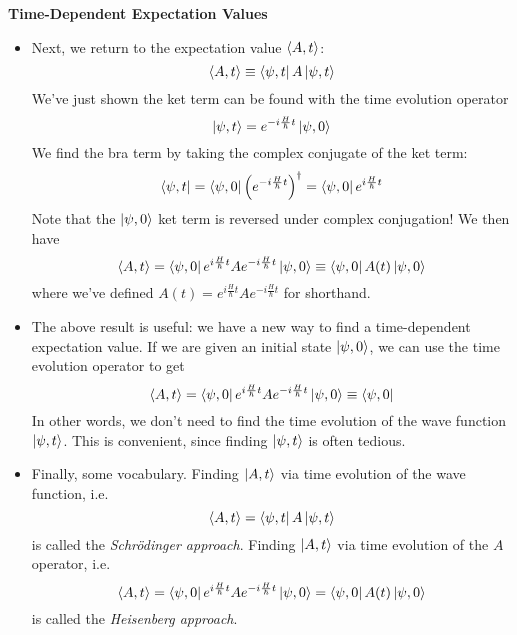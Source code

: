 \documentclass[11pt, a4paper]{article}
\newcommand{\Schro}{Schr\"{o}dinger\xspace}
\newcommand{\tev}{e^{-i\frac{H}{\hbar}t}}  %
\newcommand{\tevp}{e^{i\frac{H}{\hbar}t}}  %
\begin{document}
\textbf{Time-Dependent Expectation Values}
\begin{itemize}
	
	\item Next, we return to the expectation value $ \ev{A, t} $:
	\begin{equation*}
		\ev{A, t} \equiv \bra{\psi, t} A \ket{\psi, t}
	\end{equation*}
	We've just shown the ket term can be found with the time evolution operator
	\begin{equation*}
		\ket{\psi, t} = \tev \ket{\psi, 0}
	\end{equation*}
	We find the bra term by taking the complex conjugate of the ket term:
	\begin{equation*}
		\bra{\psi, t} = \bra{\psi, 0}\left(\tev\right)^{\dagger} = \bra{\psi, 0}\tevp
	\end{equation*}
	Note that the $ \ket{\psi, 0} $ ket term is reversed under complex conjugation! We then have
	\begin{equation*}
		\ev{A, t} = \bra{\psi, 0}\tevp A \tev \ket{\psi, 0} \equiv  \bra{\psi, 0} A(t) \ket{\psi, 0}
	\end{equation*}
	where we've defined $ A(t) = \tevp A \tev  $ for shorthand.
	
	\item The above result is useful: we have a new way to find a time-dependent expectation value. If we are given an initial state $ \ket{\psi, 0} $, we can use the time evolution operator to get
	\begin{equation*}
		\ev{A, t} = \bra{\psi, 0}\tevp A \tev \ket{\psi, 0} \equiv  \bra{\psi, 0}
	\end{equation*}
	In other words, we don't need to find the time evolution of the wave function $ \ket{\psi, t} $. This is convenient, since finding $ \ket{\psi, t} $ is often tedious.
	
	\item Finally, some vocabulary. Finding $ \ket{A, t} $ via time evolution of the wave function, i.e. 
	\begin{equation*}
		\ev{A, t} = \bra{\psi, t} A \ket{\psi, t}
	\end{equation*}
	is called the \textit{\Schro approach}. Finding $ \ket{A, t} $ via time evolution of the $ A $ operator, i.e. 
	\begin{equation*}
		\ev{A, t} = \bra{\psi, 0}\tevp A \tev \ket{\psi, 0} = \bra{\psi, 0} A(t) \ket{\psi, 0}
	\end{equation*}
	is called the \textit{Heisenberg approach}. 
\end{itemize}
\end{document}
